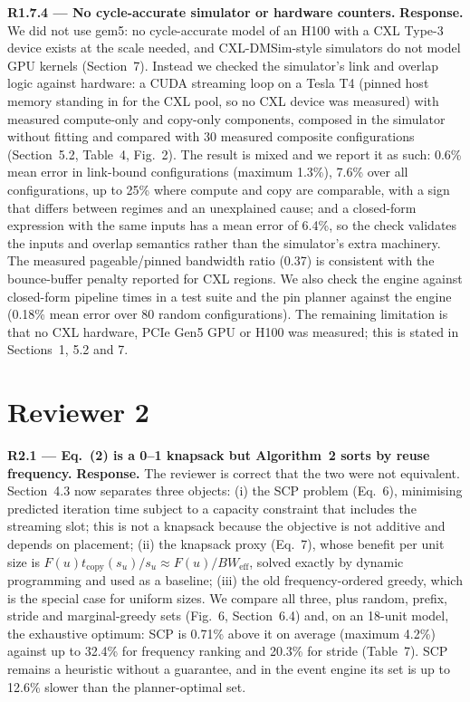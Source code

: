 \documentclass[11pt]{article}
\newcommand{\rc}[1]{\par\medskip\noindent\textbf{#1}}
\begin{document}
\rc{R1.7.4 --- No cycle-accurate simulator or hardware counters.}
\textbf{Response.} We did not use gem5: no cycle-accurate model of an H100 with a CXL Type-3 device exists at the scale needed, and CXL-DMSim-style simulators do not model GPU kernels (Section~7). Instead we checked the simulator's link and overlap logic against hardware: a CUDA streaming loop on a Tesla T4 (pinned host memory standing in for the CXL pool, so no CXL device was measured) with measured compute-only and copy-only components, composed in the simulator without fitting and compared with 30 measured composite configurations (Section~5.2, Table~4, Fig.~2). The result is mixed and we report it as such: 0.6\% mean error in link-bound configurations (maximum 1.3\%), 7.6\% over all configurations, up to 25\% where compute and copy are comparable, with a sign that differs between regimes and an unexplained cause; and a closed-form expression with the same inputs has a mean error of 6.4\%, so the check validates the inputs and overlap semantics rather than the simulator's extra machinery. The measured pageable/pinned bandwidth ratio (0.37) is consistent with the bounce-buffer penalty reported for CXL regions. We also check the engine against closed-form pipeline times in a test suite and the pin planner against the engine (0.18\% mean error over 80 random configurations). The remaining limitation is that no CXL hardware, PCIe Gen5 GPU or H100 was measured; this is stated in Sections~1, 5.2 and 7.

\section*{Reviewer 2}

\rc{R2.1 --- Eq.~(2) is a 0--1 knapsack but Algorithm~2 sorts by reuse frequency.}
\textbf{Response.} The reviewer is correct that the two were not equivalent. Section~4.3 now separates three objects: (i) the SCP problem (Eq.~6), minimising predicted iteration time subject to a capacity constraint that includes the streaming slot; this is not a knapsack because the objective is not additive and depends on placement; (ii) the knapsack proxy (Eq.~7), whose benefit per unit size is $F(u)t_{\mathrm{copy}}(s_u)/s_u\approx F(u)/BW_{\mathrm{eff}}$, solved exactly by dynamic programming and used as a baseline; (iii) the old frequency-ordered greedy, which is the special case for uniform sizes. We compare all three, plus random, prefix, stride and marginal-greedy sets (Fig.~6, Section~6.4) and, on an 18-unit model, the exhaustive optimum: SCP is 0.71\% above it on average (maximum 4.2\%) against up to 32.4\% for frequency ranking and 20.3\% for stride (Table~7). SCP remains a heuristic without a guarantee, and in the event engine its set is up to 12.6\% slower than the planner-optimal set.
\end{document}

